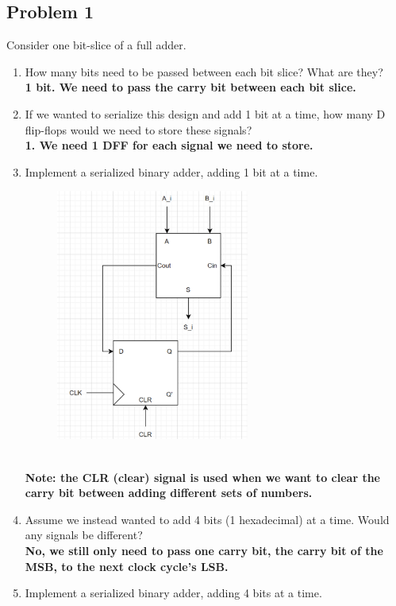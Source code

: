 \documentclass{article}
\begin{document}
\subsection*{Problem 1}
Consider one bit-slice of a full adder.
\begin{enumerate}[label=\alph*.]
    \item How many bits need to be passed between each bit slice? What are they? \\
    \textbf{1 bit. We need to pass the carry bit between each bit slice.}
    \item If we wanted to serialize this design and add 1 bit at a time, how many D flip-flops would we need to store these signals? \\
    \textbf{1. We need 1 DFF for each signal we need to store.}
    \item Implement a serialized binary adder, adding 1 bit at a time.
    \begin{figure}[!h]
        \centering
        \includegraphics[width=0.6\textwidth]{figures/serial1c_solution.png}
    \end{figure}
    \\ \textbf{Note: the CLR (clear) signal is used when we want to clear the carry bit between adding different sets of numbers.}
    \item Assume we instead wanted to add 4 bits (1 hexadecimal) at a time. Would any signals be different?
    \\ \textbf{No, we still only need to pass one carry bit, the carry bit of the MSB, to the next clock cycle’s LSB.}
    \newpage
    \item Implement a serialized binary adder, adding 4 bits at a time.

\end{enumerate}
\end{document}
